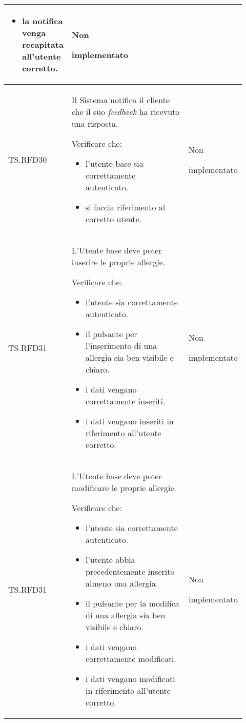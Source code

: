 \begin{longtable}{|p{0.10\linewidth}|p{0.70\linewidth}|p{0.12\linewidth}|}
\begin{itemize}
        \item la notifica venga recapitata all'utente corretto.
    \end{itemize}&
    Non \par implementato  \\
    \hline
    TS.RFD30 & 
    Il Sistema notifica il cliente che il suo \textit{feedback} ha ricevuto una risposta. \par 
    Verificare che: 
    \begin{itemize}
        \item l'utente base sia correttamente autenticato.
        \item si faccia riferimento al corretto utente.
    \end{itemize}&
    Non \par implementato  \\
    \hline
    TS.RFD31 & 
    L’Utente base deve poter inserire le proprie allergie. \par 
    Verificare che: 
    \begin{itemize}
        \item l'utente sia correttamente autenticato.
        \item il pulsante per l'inserimento di una allergia sia ben visibile e chiaro.
        \item i dati vengano correttamente inseriti.
        \item i dati vengano inseriti in riferimento all'utente corretto.
    \end{itemize}&
    Non \par implementato  \\
    \hline
    TS.RFD31 & 
    L’Utente base deve poter modificare le proprie allergie. \par 
    Verificare che: 
    \begin{itemize}
        \item l'utente sia correttamente autenticato.
        \item l'utente abbia precedentemente inserito almeno una allergia.
        \item il pulsante per la modifica di una allergia sia ben visibile e chiaro.
        \item i dati vengano correttamente modificati.
        \item i dati vengano modificati in riferimento all'utente corretto.
    \end{itemize}&
    Non \par implementato  \\

\end{longtable}
